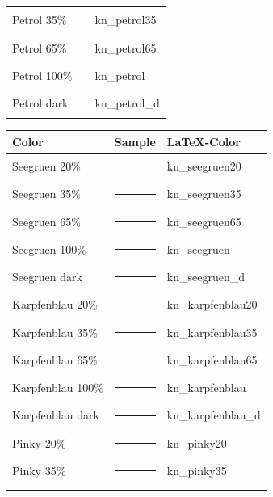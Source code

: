 \begin{center}
\begin{tabular}{@{}lll@{}}
        Petrol 35\%   & \textcolor{kn_petrol35}{\rule{1cm}{0.2cm}}  & kn\_petrol35   \\ \hdashline
        Petrol 65\%   & \textcolor{kn_petrol65}{\rule{1cm}{0.2cm}}  & kn\_petrol65   \\ \hdashline
        Petrol 100\%  & \textcolor{kn_petrol}{\rule{1cm}{0.2cm}}    & kn\_petrol     \\ \hdashline
        Petrol dark   & \textcolor{kn_petrol_d}{\rule{1cm}{0.2cm}}  & kn\_petrol\_d  \\ \bottomrule
    \end{tabular}
    \begin{tabular}{@{}lll@{}}
        \toprule
        Color             & Sample                                          & \LaTeX -Color      \\ \midrule
        Seegruen 20\%     & \textcolor{kn_seegruen20}{\rule{1cm}{0.2cm}}    & kn\_seegruen20     \\ \hdashline
        Seegruen 35\%     & \textcolor{kn_seegruen35}{\rule{1cm}{0.2cm}}    & kn\_seegruen35     \\ \hdashline
        Seegruen 65\%     & \textcolor{kn_seegruen65}{\rule{1cm}{0.2cm}}    & kn\_seegruen65     \\ \hdashline
        Seegruen 100\%    & \textcolor{kn_seegruen}{\rule{1cm}{0.2cm}}      & kn\_seegruen       \\ \hdashline
        Seegruen dark     & \textcolor{kn_seegruen_d}{\rule{1cm}{0.2cm}}    & kn\_seegruen\_d    \\ \hdashline
        Karpfenblau 20\%  & \textcolor{kn_karpfenblau20}{\rule{1cm}{0.2cm}} & kn\_karpfenblau20  \\ \hdashline
        Karpfenblau 35\%  & \textcolor{kn_karpfenblau35}{\rule{1cm}{0.2cm}} & kn\_karpfenblau35  \\ \hdashline
        Karpfenblau 65\%  & \textcolor{kn_karpfenblau65}{\rule{1cm}{0.2cm}} & kn\_karpfenblau65  \\ \hdashline
        Karpfenblau 100\% & \textcolor{kn_karpfenblau}{\rule{1cm}{0.2cm}}   & kn\_karpfenblau    \\ \hdashline
        Karpfenblau dark  & \textcolor{kn_karpfenblau_d}{\rule{1cm}{0.2cm}} & kn\_karpfenblau\_d \\ \hdashline
        Pinky 20\%        & \textcolor{kn_pinky20}{\rule{1cm}{0.2cm}}       & kn\_pinky20        \\ \hdashline
        Pinky 35\%        & \textcolor{kn_pinky35}{\rule{1cm}{0.2cm}}       & kn\_pinky35        \\ \hdashline

\end{tabular}
\end{center}

